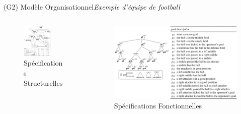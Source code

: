 \begin{frame}{(G2) Modèle Organisationnel}{\textit{Exemple d'équipe de football}}

    \vspace{-2.5ex}

    \begin{columns}
        \hspace{-16ex}
        \begin{column}{0.5\textwidth}
            \centering
            \begin{figure}[H]
                \includegraphics[width=0.7\textwidth]{figures/soccer_ss.png}
                \caption*{Spécifications Structurelles}
            \end{figure}
        \end{column}
        \hspace{-20ex}
        \begin{column}{0.5\textwidth}
            \centering
            \begin{figure}[H]
                \centering
                \includegraphics[width=1.2\textwidth]{figures/soccer_fs.png}
                \caption*{Spécifications Fonctionnelles}
            \end{figure}
        \end{column}
    \end{columns}


\end{frame}
